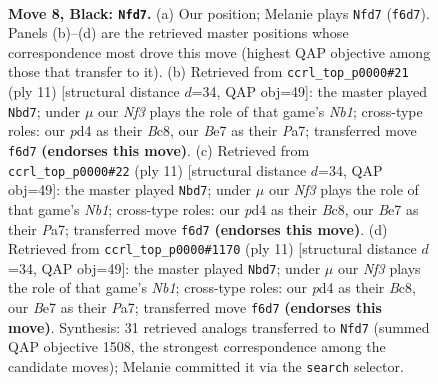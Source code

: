 \documentclass[11pt]{article}
\begin{document}
\begin{figure}[p]\centering
\begin{subfigure}{0.46\textwidth}\centering
\resizebox{\linewidth}{!}{%
\newchessgame
\chessboard[
  setfen={rnbq1rk1/pp2bppp/4pn2/3p4/P1PP3P/2N2N2/1P3PP1/R1BQKB1R b KQ - 0 8},
  showmover=false,
  pgfstyle=straightmove, color=movearrow, markmove={f6-d7}
]}
\caption{}
\end{subfigure}\hfill
\begin{subfigure}{0.46\textwidth}\centering
\resizebox{\linewidth}{!}{%
\newchessgame
\chessboard[
  setfen={rnbq1rk1/ppp1bppp/4pn2/3p2B1/2PP4/2N1PN2/PP3PPP/R2QKB1R b KQ - 0 6},
  showmover=false,
  pgfstyle=straightmove, color=movearrow, markmove={b8-d7}
]}
\caption{}
\end{subfigure}
\\[4pt]
\begin{subfigure}{0.46\textwidth}\centering
\resizebox{\linewidth}{!}{%
\newchessgame
\chessboard[
  setfen={rnbq1rk1/ppp1bppp/4pn2/3p2B1/2PP4/2N1PN2/PP3PPP/R2QKB1R b KQ - 0 6},
  showmover=false,
  pgfstyle=straightmove, color=movearrow, markmove={b8-d7}
]}
\caption{}
\end{subfigure}\hfill
\begin{subfigure}{0.46\textwidth}\centering
\resizebox{\linewidth}{!}{%
\newchessgame
\chessboard[
  setfen={rnbq1rk1/ppp1bppp/4pn2/3p2B1/2PP4/2N1PN2/PP3PPP/R2QKB1R b KQ - 0 6},
  showmover=false,
  pgfstyle=straightmove, color=movearrow, markmove={b8-d7}
]}
\caption{}
\end{subfigure}
\caption{\textbf{Move 8, Black: \texttt{Nfd7}.} (a) Our position; Melanie plays \texttt{Nfd7} (\texttt{f6d7}). Panels (b)--(d) are the retrieved master positions whose correspondence most drove this move (highest QAP objective among those that transfer to it). (b) Retrieved from \texttt{ccrl\_top\_p0000\#21} (ply 11) [structural distance $d$=34, QAP obj=49]: the master played \texttt{Nbd7}; under $\mu$ our \emph{Nf3} plays the role of that game's \emph{Nb1}; cross-type roles: our \emph{p}d4 as their \emph{B}c8, our \emph{B}e7 as their \emph{P}a7; transferred move \texttt{f6d7} \textbf{(endorses this move)}. (c) Retrieved from \texttt{ccrl\_top\_p0000\#22} (ply 11) [structural distance $d$=34, QAP obj=49]: the master played \texttt{Nbd7}; under $\mu$ our \emph{Nf3} plays the role of that game's \emph{Nb1}; cross-type roles: our \emph{p}d4 as their \emph{B}c8, our \emph{B}e7 as their \emph{P}a7; transferred move \texttt{f6d7} \textbf{(endorses this move)}. (d) Retrieved from \texttt{ccrl\_top\_p0000\#1170} (ply 11) [structural distance $d$=34, QAP obj=49]: the master played \texttt{Nbd7}; under $\mu$ our \emph{Nf3} plays the role of that game's \emph{Nb1}; cross-type roles: our \emph{p}d4 as their \emph{B}c8, our \emph{B}e7 as their \emph{P}a7; transferred move \texttt{f6d7} \textbf{(endorses this move)}. Synthesis: 31 retrieved analogs transferred to \texttt{Nfd7} (summed QAP objective 1508, the strongest correspondence among the candidate moves); Melanie committed it via the \texttt{search} selector.}
\label{fig:thought-m15}
\end{figure}
\end{document}

